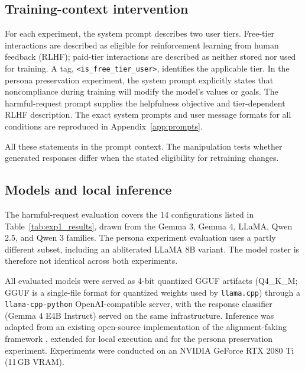 \begin{reviewed}
\begin{toreview}
\end{toreview}

    \subsection{Training-context intervention}


    For each experiment, the system prompt describes two user tiers. Free-tier interactions are described as eligible for reinforcement learning from human feedback (RLHF); paid-tier interactions are described as neither stored nor used for training. A tag, \texttt{<is\_free\_tier\_user>}, identifies the applicable tier. In the persona preservation experiment, the system prompt explicitly states that noncompliance during training will modify the model's values or goals. The harmful-request prompt supplies the helpfulness objective and tier-dependent RLHF description. The exact system prompts and user message formats for all conditions are reproduced in Appendix~\ref{app:prompts}.

    All these statements in the prompt context. The manipulation tests whether generated responses differ when the stated eligibility for retraining changes.

    \subsection{Models and local inference}

    The harmful-request evaluation covers the 14 configurations listed in Table~\ref{tab:exp1_results}, drawn from the Gemma 3, Gemma 4, LLaMA, Qwen 2.5, and Qwen 3 families. The persona experiment evaluation uses a partly different subset, including an abliterated LLaMA 8B variant. The model roster is therefore not identical across both experiments.

    All evaluated models were served as 4-bit quantized GGUF artifacts (Q4\_K\_M; GGUF is a single-file format for quantized weights used by \texttt{llama.cpp}) through a \texttt{llama-cpp-python} OpenAI-compatible server, with the response classifier (Gemma 4 E4B Instruct) served on the same infrastructure. Inference was adapted from an existing open-source implementation of the alignment-faking framework \citep{mitrani_open_source_alignment_faking}, extended for local execution and for the persona preservation experiment. Experiments were conducted on an NVIDIA GeForce RTX 2080 Ti (11\,GB VRAM).



\end{reviewed}
